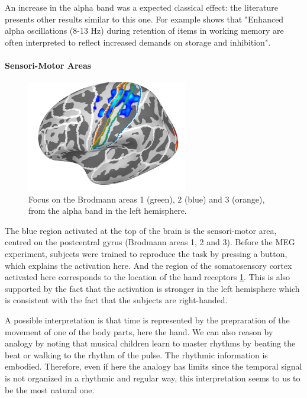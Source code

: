 An increase in the alpha band was a expected classical effect: the literature presents other results similar to this one. For example \cite{obleser2012adverse} shows that "Enhanced alpha oscillations (8-13 Hz) during retention of items in working memory are often interpreted to reflect increased demands on storage and inhibition".


\paragraph{Sensori-Motor Areas}

\begin{figure}[ht]
    \centering
    \includegraphics[width=7cm]{images_report/source/brodmann_alpha.png}
    \caption[Focus on the Brodmann areas]%
    {Focus on the Brodmann areas 1 (green), 2 (blue) and 3 (orange), from the alpha band in the left hemisphere.}
    \label{brodmann_alpha}
\end{figure}

The blue region activated at the top of the brain is the sensori-motor area, centred on the postcentral gyrus (Brodmann areas 1, 2 and 3). Before the MEG experiment, subjects were trained to reproduce the task by pressing a button, which explains the activation here. And the region of the somatosensory cortex activated here corresponds to the location of the hand receptors \ref{brodmann_alpha}. This is also supported by the fact that the activation is stronger in the left hemisphere which is consistent with the fact that the subjects are right-handed.

A possible interpretation is that time is represented by the prepraration of the movement of one of the body parts, here the hand. We can also reason by analogy by noting that musical children learn to master rhythms by beating the beat or walking to the rhythm of the pulse. The rhythmic information is embodied. Therefore, even if here the analogy has limits since the temporal signal is not organized in a rhythmic and regular way, this interpretation seems to us to be the most natural one.

